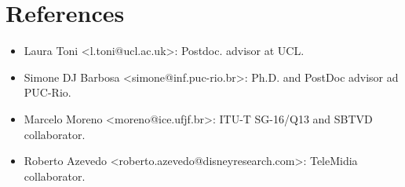\documentclass[10pt,a4paper,sans,colorlinks]{moderncv}
\begin{document}
\section{References}

\begin{itemize}[nosep]
  \item Laura Toni <l.toni@ucl.ac.uk>: Postdoc. advisor at UCL.
  
  
  \item Simone DJ Barbosa <simone@inf.puc-rio.br>: Ph.D. and PostDoc advisor ad PUC-Rio.
  
  \item Marcelo Moreno <moreno@ice.ufjf.br>: ITU-T SG-16/Q13 and SBTVD collaborator. 
  
  \item Roberto Azevedo <roberto.azevedo@disneyresearch.com>: TeleMidia collaborator. 
  
  
  
\end{itemize}
\end{document}
